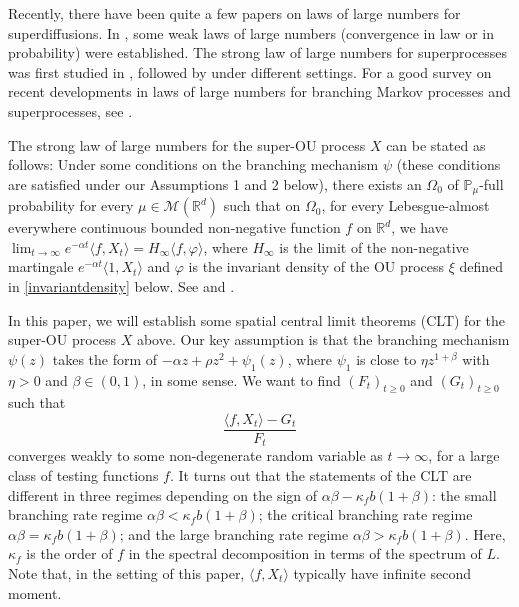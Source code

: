\documentclass[12pt,a4paper]{amsart}
\theoremstyle{plain}
\theoremstyle{definition}
\numberwithin{equation}{section}
\begin{document}
    Recently, there have been quite a few papers on laws of large numbers for superdiffusions. In \cite{Englander2009Law, EnglanderWinter2006Law, EnglanderTuraev2002A-scaling}, some weak laws of large numbers (convergence in law or in probability) were established. The strong law of large numbers for superprocesses was first studied in \cite{ChenRenWang2008An-almost},
    followed by \cite{ChenRenSongZhang2015Strong-law, ChenRenYang2019Skeleton, EckhoffKyprianouWinkel2015Spines,KouritzinRen2014A-strong,LiuRenSong2013Strong, Wang2010An-almost} under different settings.
    For a good survey on recent developments in laws of large numbers for branching Markov processes and superprocesses, see \cite{EckhoffKyprianouWinkel2015Spines}.

   The strong law of large numbers for the super-OU process $X$ can be stated as follows:
    Under some conditions on the branching mechanism $\psi$ (these conditions are satisfied under our Assumptions 1 and 2 below), there exists an $\Omega_0$ of $\mathbb{P}_\mu$-full probability for every $\mu\in\mathcal M(\mathbb R^d)$ such that on $\Omega_0$,
    for every Lebesgue-almost everywhere continuous bounded non-negative function $f$ on $\mathbb R^d$,
    we have
    $\lim_{t\to\infty}e^{-\alpha t}\langle f, X_t\rangle=H_\infty\langle f, \varphi\rangle $,
    where $H_\infty$ is the limit of the non-negative martingale $e^{-\alpha t}\langle 1,X_t\rangle$ and
$\varphi$ is the invariant density of the OU process $\xi$ defined in \eqref{invariantdensity} below.
    See \cite[Theorem 2.13 \& Example 8.1]{ChenRenYang2019Skeleton} and \cite[Theorem 1.2 \& Example 4.1]{EckhoffKyprianouWinkel2015Spines}.

    In this paper, we will establish some spatial central limit theorems (CLT) for the super-OU process $X$ above.
    Our key assumption is that the branching mechanism $\psi(z)$ takes the form of $-\alpha z +\rho z^2+ \psi_1(z)$, where $\psi_1$ is close to $\eta z^{1+\beta}$ with $\eta>0$ and $\beta\in (0, 1)$, in some sense.
    We want to find
    $(F_t)_{t\geq 0}$ and $(G_t)_{t\geq 0}$ such that
\[
    \frac{\langle f, X_t \rangle -G_t}{F_t}
\]
    converges weakly to some non-degenerate random variable as $t\rightarrow\infty$, for a large class of testing functions $f$.
    It turns out that the statements of the CLT are different in three regimes
    depending on the sign of $\alpha\beta-\kappa_f b (1+\beta)$: the small branching rate regime $\alpha\beta< \kappa_f b(1+\beta)$; the critical branching rate regime $\alpha\beta = \kappa_f b(1+\beta)$; and the large branching rate regime $\alpha\beta > \kappa_f b(1+\beta)$. Here, $\kappa_f$ is the order of $f$ in the spectral decomposition in terms of the spectrum of $L$.
    Note that, in the setting of this paper, $\langle f,X_t\rangle$ typically have infinite second moment.
\end{document}
